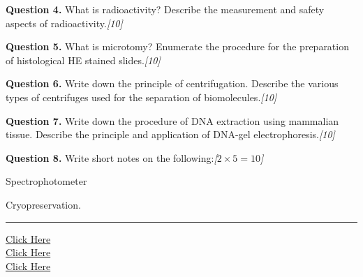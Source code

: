 \documentclass[11pt,a4paper]{article}
\newcommand{\pts}[1]{\hfill   \textit{[#1]}}
\begin{document}
\medskip


\noindent   \textbf{Question 4.} What is radioactivity? Describe the measurement and safety aspects of radioactivity.\pts{10}

\medskip


\noindent   \textbf{Question 5.} What is microtomy? Enumerate the procedure for the preparation of histological HE stained slides.\pts{10}

\medskip


\noindent   \textbf{Question 6.} Write down the principle of centrifugation. Describe the various types of centrifuges used for the separation of biomolecules.\pts{10}

\medskip


\noindent   \textbf{Question 7.} Write down the procedure of DNA extraction using mammalian tissue. Describe the principle and application of DNA-gel electrophoresis.\pts{10}

\medskip


\noindent   \textbf{Question 8.} Write short notes on the following:\pts{$2  \times 5 = 10$}

\begin{parts}
  \item Spectrophotometer
  \item Cryopreservation.
\end{parts}

\vfill
\rule{\linewidth}{0.4pt}

\begin{center}\small
\href{https://bhu-exam.vercel.app/}{Click Here}\\[4pt]\href{https://me-aryan.vercel.app/}{Click Here}\\[4pt]\href{https://quashan-me.vercel.app/}{Click Here}
\end{center}
\end{document}
